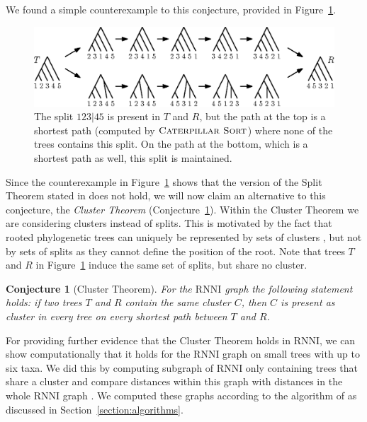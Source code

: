\documentclass{amsart}
\newcommand{\rnni}{\mathrm{RNNI}}
\newcommand{\csort}{\textsc{Caterpillar Sort}}
\newtheorem{conjecture}[definition]{Conjecture}
\begin{document}
We found a simple counterexample to this conjecture, provided in Figure~\ref{fig:splitthm_counterexample}.

\begin{figure}[H]
\centering
\includegraphics[width=\textwidth]{splitthm_counterexample}
\vspace{12pt}
\caption{The split $123|45$ is present in $T$ and $R$, but the path at the top is a shortest path (computed by $\csort$) where none of the trees contains this split.
On the path at the bottom, which is a shortest path as well, this split is maintained.}
\label{fig:splitthm_counterexample}
\end{figure}

Since the counterexample in Figure~\ref{fig:splitthm_counterexample} shows that the version of the Split Theorem stated in \autocite{Gavryushkin2018-ol} does not hold, we will now claim an alternative to this conjecture, the \emph{Cluster Theorem} (Conjecture~\ref{conjecture:cluster_theorem}).
Within the Cluster Theorem we are considering clusters instead of splits.
This is motivated by the fact that rooted phylogenetic trees can uniquely be represented by sets of clusters \autocite{Steel2016-ye}, but not by sets of splits as they cannot define the position of the root.
Note that trees $T$ and $R$ in Figure~\ref{fig:splitthm_counterexample} induce the same set of splits, but share no cluster.

\begin{conjecture}[Cluster Theorem]
For the $\rnni$ graph the following statement holds:
if two trees $T$ and $R$ contain the same cluster $C$, then $C$ is present as cluster in every tree on every shortest path between $T$ and $R$.
\label{conjecture:cluster_theorem}
\end{conjecture}


For providing further evidence that the Cluster Theorem holds in $\rnni$, we can show computationally that it holds for the $\rnni$ graph on small trees with up to six taxa.
We did this by computing subgraph of $\rnni$ only containing trees that share a cluster and compare distances within this graph with distances in the whole $\rnni$ graph \autocite{Collienne2019}.
We computed these graphs according to the algorithm of \autocite{Gavryushkin2018-ol} as discussed in Section~\ref{section:algorithms}.
\end{document}
